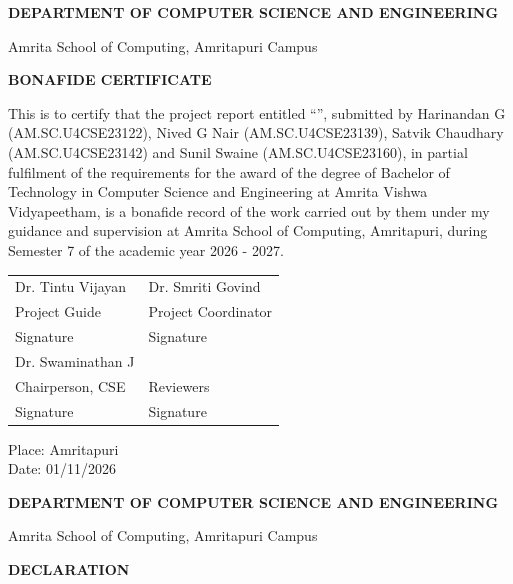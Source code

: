 \clearpage
{\centering \institutionlogo{3.7in}\par}
\vspace{0.3cm}
{\centering \textbf{DEPARTMENT OF COMPUTER SCIENCE AND ENGINEERING}\par}
{\centering Amrita School of Computing, Amritapuri Campus\par}
\vspace{0.5cm}
{\centering \Large\bfseries BONAFIDE CERTIFICATE\par}
\vspace{0.5cm}
This is to certify that the project report entitled ``\ProjectTitle{}'', submitted by Harinandan G (AM.SC.U4CSE23122), Nived G Nair (AM.SC.U4CSE23139), Satvik Chaudhary (AM.SC.U4CSE23142) and Sunil Swaine (AM.SC.U4CSE23160), in partial fulfilment of the requirements for the award of the degree of Bachelor of Technology in Computer Science and Engineering at Amrita Vishwa Vidyapeetham, is a bonafide record of the work carried out by them under my guidance and supervision at Amrita School of Computing, Amritapuri, during Semester 7 of the academic year 2026 - 2027.

\vspace{1cm}
\begin{tabular}{p{}p{}} Dr. Tintu Vijayan & Dr. Smriti Govind \\ Project Guide & Project Coordinator \\ Signature \hrulefill & Signature \hrulefill \\[20pt] Dr. Swaminathan J &  \\ Chairperson, CSE & Reviewers \\ Signature \hrulefill & Signature \hrulefill \end{tabular}

\vspace{1cm}
Place: Amritapuri\\
Date: 01/11/2026
\clearpage
\thispagestyle{empty}

{\centering
\institutionlogo{3.7in}\par
\vspace{0.4cm}
\textbf{DEPARTMENT OF COMPUTER SCIENCE AND ENGINEERING}\par
Amrita School of Computing, Amritapuri Campus\par
\vspace{0.6cm}
{\Large\bfseries DECLARATION\par}
}

\vspace{0.5cm}

